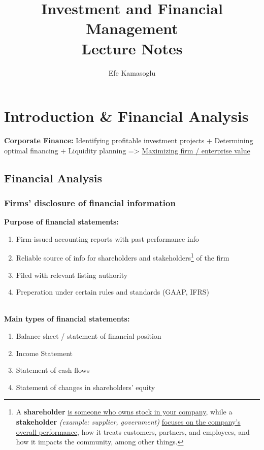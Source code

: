 \documentclass[ieeetran]{article}
\title{Investment and Financial Management \\Lecture Notes}
\author{Efe Kamasoglu}
\begin{document}
\maketitle

\pagebreak

\section{Introduction \& Financial Analysis} %
\label{sec:introduction_&_financial_analysis}

\textbf{Corporate Finance:}
Identifying profitable investment projects + Determining optimal financing + Liquidity planning
=> \underline{Maximizing firm / enterprise value}

\subsection{Financial Analysis} %
\label{sub:}

\subsubsection{Firms' disclosure of financial information} %
\label{ssub:firms_disclosure_of_financial_information}

\textbf{Purpose of financial statements:}
\begin{enumerate}
  \item Firm-issued accounting reports with past performance info
\item Reliable source of info for shareholders and stakeholders\footnote{A \textbf{shareholder} \underline{is someone who owns stock in your company}, while a \textbf{stakeholder} \textit{(example: supplier, government)} \underline{focuses on the company's overall performance}, how it treats customers, partners, and employees, and how it impacts the community, among other things.} of the firm
  \item Filed with relevant listing authority
  \item Preperation under certain rules and standards (GAAP, IFRS)
\end{enumerate}

\textbf{\\Main types of financial statements:}
\begin{enumerate}
  \item Balance sheet / statement of financial position
  \item Income Statement 
  \item Statement of cash flows
  \item Statement of changes in shareholders' equity
\end{enumerate}
 
\end{document}
